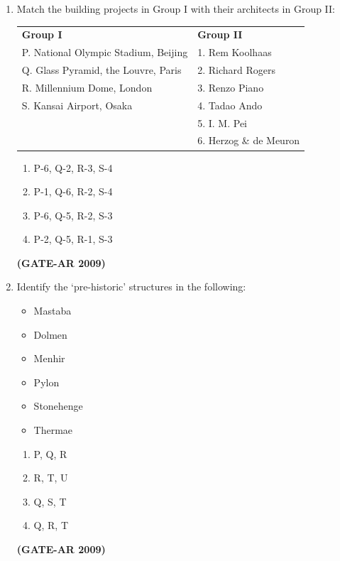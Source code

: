 \documentclass[a4paper,10pt]{article}
\begin{document}
\begin{enumerate}
    \item Match the building projects in Group I with their architects in Group II:  \\
    \begin{tabular}{ l l }
	\textbf{Group I} & \textbf{Group II} \\
	P. National Olympic Stadium, Beijing & 1. Rem Koolhaas \\
	Q. Glass Pyramid, the Louvre, Paris & 2. Richard Rogers \\
	R. Millennium Dome, London & 3. Renzo Piano \\
	S. Kansai Airport, Osaka & 4. Tadao Ando \\
	& 5. I. M. Pei \\
	& 6. Herzog \& de Meuron \\
	\end{tabular}
	\begin{multicols}{2}
	\begin{enumerate}
        \item P-6, Q-2, R-3, S-4
        \item P-1, Q-6, R-2, S-4
        \item P-6, Q-5, R-2, S-3
        \item P-2, Q-5, R-1, S-3
    \end{enumerate}
	\end{multicols}
    \hfill \textbf{(GATE-AR 2009)}

    \item Identify the ‘pre-historic’ structures in the following: 
    \begin{itemize}
        \item Mastaba
        \item Dolmen
        \item Menhir
        \item Pylon
        \item Stonehenge
        \item Thermae
    \end{itemize}
    \begin{multicols}{4}
	\begin{enumerate}
        \item P, Q, R
        \item R, T, U
        \item Q, S, T
        \item Q, R, T
    \end{enumerate}
	\end{multicols}
    \hfill \textbf{(GATE-AR 2009)}


\end{enumerate}
\end{document}

